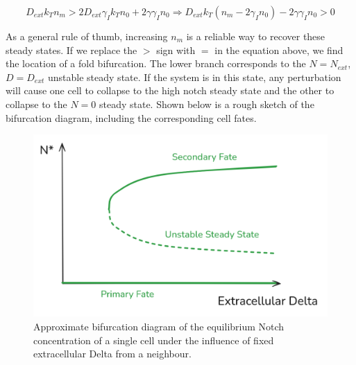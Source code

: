 \documentclass{article}
\begin{document}
\begin{flushleft}
$$D_{ext}k_{T}n_{m} > 2D_{ext}\gamma_{I}k_{T}n_{0} + 2\gamma \gamma_{I} n_{0} \Rightarrow D_{ext}k_{T}(n_{m} - 2\gamma_{I}n_{0}) - 2\gamma \gamma_{I} n_{0} > 0$$

As a general rule of thumb, increasing $n_{m}$ is a reliable way to recover these steady states. If we replace the $>$ sign with $=$ in the equation above, we find the location of a fold bifurcation. The lower branch corresponds to the $N = N_{ext}$, $D = D_{ext}$ unstable steady state. If the system is in this state, any perturbation will cause one cell to collapse to the high notch steady state and the other to collapse to the $N = 0$ steady state. Shown below is a rough sketch of the bifurcation diagram, including the corresponding cell fates.

\begin{figure}
  \includegraphics[width=\textwidth]{img/bifurcation-diagram.png}
  \caption{Approximate bifurcation diagram of the equilibrium Notch concentration of a single cell under the influence of fixed extracellular Delta from a neighbour.}
\end{figure}


\end{flushleft}
\end{document}
